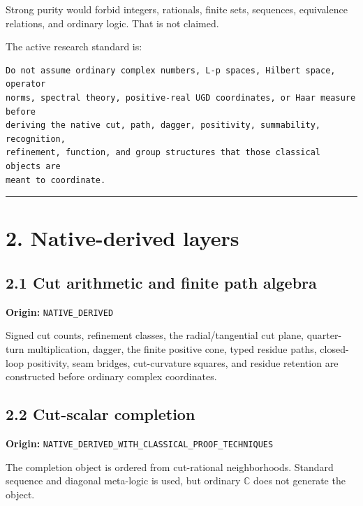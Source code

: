 Strong purity would forbid integers, rationals, finite sets, sequences,
equivalence relations, and ordinary logic. That is not claimed.

The active research standard is:

\begin{verbatim}
Do not assume ordinary complex numbers, L-p spaces, Hilbert space, operator
norms, spectral theory, positive-real UGD coordinates, or Haar measure before
deriving the native cut, path, dagger, positivity, summability, recognition,
refinement, function, and group structures that those classical objects are
meant to coordinate.
\end{verbatim}

\begin{center}\rule{0.5\linewidth}{0.5pt}\end{center}

\hypertarget{native-derived-layers}{%
\section{2. Native-derived layers}\label{native-derived-layers}}

\hypertarget{cut-arithmetic-and-finite-path-algebra}{%
\subsection{2.1 Cut arithmetic and finite path algebra}\label{cut-arithmetic-and-finite-path-algebra}}

\textbf{Origin:} \texttt{NATIVE\_DERIVED}

Signed cut counts, refinement classes, the radial/tangential cut plane,
quarter-turn multiplication, dagger, the finite positive cone, typed residue
paths, closed-loop positivity, seam bridges, cut-curvature squares, and residue
retention are constructed before ordinary complex coordinates.

\hypertarget{cut-scalar-completion}{%
\subsection{2.2 Cut-scalar completion}\label{cut-scalar-completion}}

\textbf{Origin:} \texttt{NATIVE\_DERIVED\_WITH\_CLASSICAL\_PROOF\_TECHNIQUES}

The completion object is ordered from cut-rational neighborhoods. Standard
sequence and diagonal meta-logic is used, but ordinary \(\mathbb C\) does not
generate the object.

